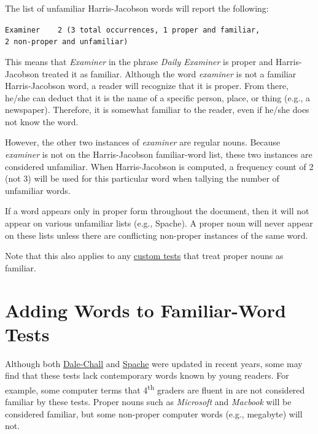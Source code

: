 \documentclass[
]{book}
\theoremstyle{definition}
\theoremstyle{definition}
\theoremstyle{definition}
\theoremstyle{definition}
\theoremstyle{remark}
\begin{document}
The list of unfamiliar Harris-Jacobson words will report the following:

\begin{FlushRight}
\texttt{Examiner\ \ \ \ 2\ (3\ total\ occurrences,\ 1\ proper\ and\ familiar,}\\
\texttt{2\ non-proper\ and\ unfamiliar)}

\end{FlushRight}

This means that \emph{Examiner} in the phrase \emph{Daily Examiner} is proper and Harris-Jacobson treated it as familiar. Although the word \emph{examiner} is not a familiar Harris-Jacobson word, a reader will recognize that it is proper. From there, he/she can deduct that it is the name of a specific person, place, or thing (e.g., a newspaper). Therefore, it is somewhat familiar to the reader, even if he/she does not know the word.

However, the other two instances of \emph{examiner} are regular nouns. Because \emph{examiner} is not on the Harris-Jacobson familiar-word list, these two instances are considered unfamiliar. When Harris-Jacobson is computed, a frequency count of 2 (not 3) will be used for this particular word when tallying the number of unfamiliar words.

If a word appears only in proper form throughout the document, then it will not appear on various unfamiliar lists (e.g., Spache). A proper noun will never appear on these lists unless there are conflicting non-proper instances of the same word.

Note that this also applies to any \protect\hyperlink{creating-custom-test}{custom tests} that treat proper nouns as familiar.

\hypertarget{adding-words-to-familiar-word-tests}{%
\section{Adding Words to Familiar-Word Tests}\label{adding-words-to-familiar-word-tests}}

Although both \protect\hyperlink{dale-chall-test}{Dale-Chall} and \protect\hyperlink{spache-test}{Spache} were updated in recent years, some may find that these tests lack contemporary words known by young readers. For example, some computer terms that 4\textsuperscript{th} graders are fluent in are not considered familiar by these tests. Proper nouns such as \emph{Microsoft} and \emph{Macbook} will be considered familiar, but some non-proper computer words (e.g., megabyte) will not.
\end{document}
